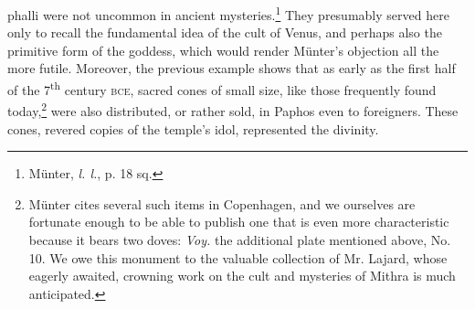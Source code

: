 \documentclass[a4paper, 11pt, oneside, polutonikogreek, english]{article}
\begin{document}
phalli were not uncommon in ancient mysteries.\footnote{Münter, \emph{l. l.}, p. 18 sq.} They presumably served here only to recall the fundamental idea of the cult of Venus, and perhaps also the primitive form of the goddess, which would render Münter's objection all the more futile. Moreover, the previous example shows that as early as the first half of the 7\textsuperscript{th} century \textsc{bce}, sacred cones of small size, like those frequently found today,\footnote{Münter cites several such items in Copenhagen, and we ourselves are fortunate enough to be able to publish one that is even more characteristic because it bears two doves: \emph{Voy.} the additional plate mentioned above, No. 10. We owe this monument to the valuable collection of Mr. Lajard, whose eagerly awaited, crowning work on the cult and mysteries of Mithra is much anticipated.} were also distributed, or rather sold, in Paphos even to foreigners. These cones, revered copies of the temple's idol, represented the divinity.
\end{document}
